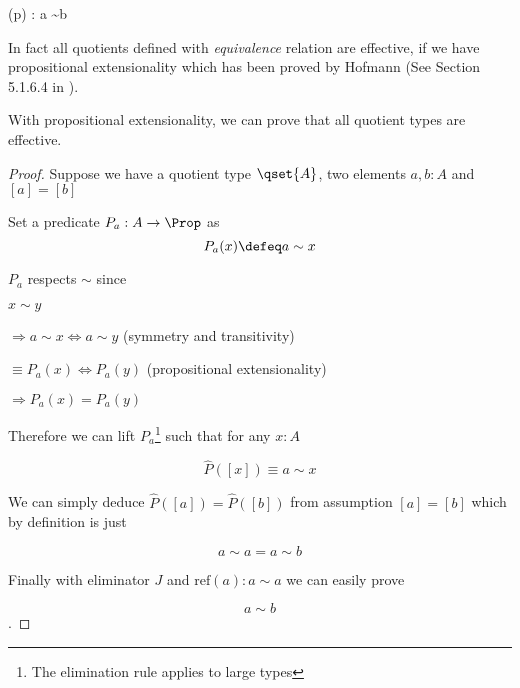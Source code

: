 {(p) : a \sim b}

In fact all quotients defined with \emph{equivalence} relation are effective, if we have propositional extensionality which has been proved by Hofmann (See Section 5.1.6.4 in \cite{hof:phd}).

\begin{theorem}\label{PUEF}
With propositional extensionality, we can prove that all quotient types are effective.
\end{theorem}
\begin{proof}

Suppose we have a quotient type $\qset{A}$, two elements $a, b : A$ and $[ a ] = [ b ]$


Set a predicate $P_a : A \to \Prop$ as 
$$P_a (x) \defeq a \sim x$$

$P_a$ respects $\sim$ since

$x \sim y$

$\Rightarrow a \sim x \iff a \sim y$ (symmetry and transitivity)

$\equiv P_a(x) \iff P_a(y)$ (propositional extensionality)

$\Rightarrow P_a(x) = P_a(y)$

Therefore we can lift $P_a$\footnote{The elimination rule applies to large types} such that for any $x : A$

$$\hat{P} ([ x ]) \equiv a \sim x$$


We can simply deduce $\hat{P} ([ a ]) = \hat{P} ([ b ])$ from assumption $[ a ] = [ b ]$ which by definition
is just

$$a \sim a  = a \sim b$$ 

Finally with eliminator $J$ and $\text{ref}(a) : a \sim a$ we can easily prove

$$a \sim b$$.

\end{proof}





